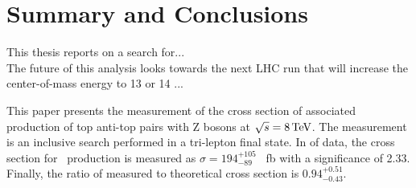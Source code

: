 \chapter{Summary and Conclusions}
\label {ch:conclusion}
This thesis reports on a search for... \\

The future of this analysis looks towards the next LHC run that will increase
the center-of-mass energy to 13 or 14 \TeV...




This paper presents the measurement of the cross section of associated production of top anti-top pairs with Z bosons at $\sqrt{s} = 8 \,\text{Te\hspace{-.08em}V}$. The measurement is an inclusive search performed in a tri-lepton final state. In \intLumi of data, the cross section for \ttZ \ production is measured as $\sigma=194 _{-89} ^{+105}$ \ fb with a significance of 2.33. Finally, the ratio of measured to theoretical cross section is $0.94_{-0.43} ^{+0.51}$.